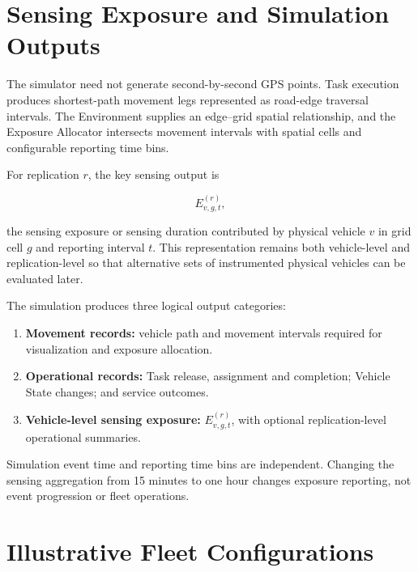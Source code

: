 \documentclass[11pt,a4paper]{article}
\begin{document}
\section{Sensing Exposure and Simulation Outputs}

The simulator need not generate second-by-second GPS points. Task execution produces shortest-path movement legs represented as road-edge traversal intervals. The Environment supplies an edge--grid spatial relationship, and the Exposure Allocator intersects movement intervals with spatial cells and configurable reporting time bins.

For replication $r$, the key sensing output is

\[
E^{(r)}_{v,g,t},
\]

the sensing exposure or sensing duration contributed by physical vehicle $v$ in grid cell $g$ and reporting interval $t$. This representation remains both vehicle-level and replication-level so that alternative sets of instrumented physical vehicles can be evaluated later.

The simulation produces three logical output categories:

\begin{enumerate}
  \item \textbf{Movement records:} vehicle path and movement intervals required for visualization and exposure allocation.
  \item \textbf{Operational records:} Task release, assignment and completion; Vehicle State changes; and service outcomes.
  \item \textbf{Vehicle-level sensing exposure:} $E^{(r)}_{v,g,t}$, with optional replication-level operational summaries.
\end{enumerate}

Simulation event time and reporting time bins are independent. Changing the sensing aggregation from 15 minutes to one hour changes exposure reporting, not event progression or fleet operations.

\section{Illustrative Fleet Configurations}
\end{document}
